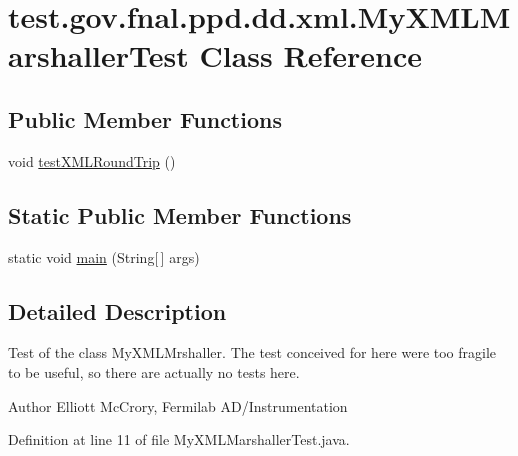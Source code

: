 \hypertarget{classtest_1_1gov_1_1fnal_1_1ppd_1_1dd_1_1xml_1_1MyXMLMarshallerTest}{\section{test.\-gov.\-fnal.\-ppd.\-dd.\-xml.\-My\-X\-M\-L\-Marshaller\-Test Class Reference}
\label{classtest_1_1gov_1_1fnal_1_1ppd_1_1dd_1_1xml_1_1MyXMLMarshallerTest}
}
\subsection*{Public Member Functions}
\begin{DoxyCompactItemize}
\item 
void \hyperlink{classtest_1_1gov_1_1fnal_1_1ppd_1_1dd_1_1xml_1_1MyXMLMarshallerTest_a2c6aabb19538d73b8de668f93bf4cc74}{test\-X\-M\-L\-Round\-Trip} ()
\end{DoxyCompactItemize}
\subsection*{Static Public Member Functions}
\begin{DoxyCompactItemize}
\item 
static void \hyperlink{classtest_1_1gov_1_1fnal_1_1ppd_1_1dd_1_1xml_1_1MyXMLMarshallerTest_aa40a509dd3eac8eedd76ad249ba8b297}{main} (String\mbox{[}$\,$\mbox{]} args)
\end{DoxyCompactItemize}


\subsection{Detailed Description}
Test of the class My\-X\-M\-L\-Mrshaller. The test conceived for here were too fragile to be useful, so there are actually no tests here.

\begin{DoxyAuthor}{Author}
Elliott Mc\-Crory, Fermilab A\-D/\-Instrumentation 
\end{DoxyAuthor}


Definition at line 11 of file My\-X\-M\-L\-Marshaller\-Test.\-java.



